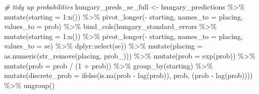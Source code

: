 \documentclass[
]{book}
\newenvironment{Shaded}{\begin{snugshade}}{\end{snugshade}}
\newcommand{\AttributeTok}[1]{\textcolor[rgb]{0.77,0.63,0.00}{#1}}
\newcommand{\CommentTok}[1]{\textcolor[rgb]{0.56,0.35,0.01}{\textit{#1}}}
\newcommand{\DecValTok}[1]{\textcolor[rgb]{0.00,0.00,0.81}{#1}}
\newcommand{\FunctionTok}[1]{\textcolor[rgb]{0.00,0.00,0.00}{#1}}
\newcommand{\NormalTok}[1]{#1}
\newcommand{\OtherTok}[1]{\textcolor[rgb]{0.56,0.35,0.01}{#1}}
\newcommand{\SpecialCharTok}[1]{\textcolor[rgb]{0.00,0.00,0.00}{#1}}
\newcommand{\StringTok}[1]{\textcolor[rgb]{0.31,0.60,0.02}{#1}}
\begin{document}
\begin{Shaded}
\begin{Highlighting}[]
\CommentTok{\# tidy up probabilities}
\NormalTok{hungary\_preds\_se\_full }\OtherTok{\textless{}{-}}\NormalTok{ hungary\_predictions }\SpecialCharTok{\%\textgreater{}\%}
  \FunctionTok{mutate}\NormalTok{(}\AttributeTok{starting =} \DecValTok{1}\SpecialCharTok{:}\FunctionTok{n}\NormalTok{()) }\SpecialCharTok{\%\textgreater{}\%}
  \FunctionTok{pivot\_longer}\NormalTok{(}\SpecialCharTok{{-}}\NormalTok{ starting, }\AttributeTok{names\_to =} \StringTok{\textquotesingle{}placing\textquotesingle{}}\NormalTok{, }\AttributeTok{values\_to =} \StringTok{\textquotesingle{}prob\textquotesingle{}}\NormalTok{) }\SpecialCharTok{\%\textgreater{}\%} 
  \FunctionTok{bind\_cols}\NormalTok{(hungary\_standard\_errors }\SpecialCharTok{\%\textgreater{}\%} \FunctionTok{mutate}\NormalTok{(}\AttributeTok{starting =} \DecValTok{1}\SpecialCharTok{:}\FunctionTok{n}\NormalTok{()) }\SpecialCharTok{\%\textgreater{}\%}
  \FunctionTok{pivot\_longer}\NormalTok{(}\SpecialCharTok{{-}}\NormalTok{ starting, }\AttributeTok{names\_to =} \StringTok{\textquotesingle{}placing\textquotesingle{}}\NormalTok{, }\AttributeTok{values\_to =} \StringTok{\textquotesingle{}se\textquotesingle{}}\NormalTok{) }\SpecialCharTok{\%\textgreater{}\%}
\NormalTok{    dplyr}\SpecialCharTok{::}\FunctionTok{select}\NormalTok{(se)) }\SpecialCharTok{\%\textgreater{}\%}
  \FunctionTok{mutate}\NormalTok{(}\AttributeTok{placing =} \FunctionTok{as.numeric}\NormalTok{(}\FunctionTok{str\_remove}\NormalTok{(placing, }\StringTok{\textquotesingle{}prob\_\textquotesingle{}}\NormalTok{))) }\SpecialCharTok{\%\textgreater{}\%}
  \FunctionTok{mutate}\NormalTok{(}\AttributeTok{prob =} \FunctionTok{exp}\NormalTok{(prob)) }\SpecialCharTok{\%\textgreater{}\%}
  \FunctionTok{mutate}\NormalTok{(}\AttributeTok{prob =}\NormalTok{ prob }\SpecialCharTok{/}\NormalTok{ (}\DecValTok{1} \SpecialCharTok{+}\NormalTok{ prob)) }\SpecialCharTok{\%\textgreater{}\%}
  \FunctionTok{group\_by}\NormalTok{(starting) }\SpecialCharTok{\%\textgreater{}\%} 
  \FunctionTok{mutate}\NormalTok{(}\AttributeTok{discrete\_prob =} \FunctionTok{ifelse}\NormalTok{(}\FunctionTok{is.na}\NormalTok{(prob }\SpecialCharTok{{-}} \FunctionTok{lag}\NormalTok{(prob)), prob, (prob }\SpecialCharTok{{-}} \FunctionTok{lag}\NormalTok{(prob)))) }\SpecialCharTok{\%\textgreater{}\%}
  \FunctionTok{ungroup}\NormalTok{()}


\end{Highlighting}
\end{Shaded}
\end{document}
